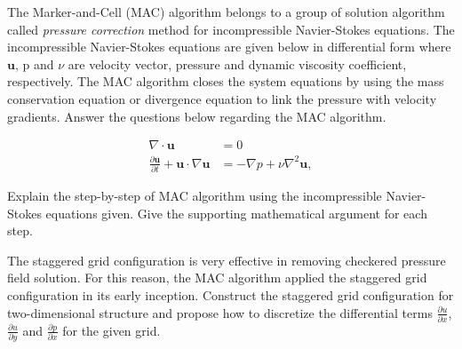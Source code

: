 \clearpage		%
\question{}

The Marker-and-Cell (MAC) algorithm belongs to a group of solution algorithm called \textit{pressure correction} method for incompressible Navier-Stokes equations. The incompressible Navier-Stokes equations are given below in differential form where $\textbf{u}$, p and $\nu$ are velocity vector, pressure and dynamic viscosity coefficient, respectively. The MAC algorithm closes the system equations by using the mass conservation equation or divergence equation to link the pressure with velocity gradients. Answer the questions below regarding the MAC algorithm.   


\begin{subequations}
\begin{align}
\nabla \cdot \textbf{u} &= 0 \nonumber  \\ \nonumber
\frac{\partial \textbf{u}}{\partial t} + \textbf{u} \cdot \nabla \textbf{u}  &= -\nabla p + \nu \nabla^2 \textbf{u},
\end{align}
\end{subequations}

\listbeginx	%
	\item Explain the step-by-step of MAC algorithm using the incompressible Navier-Stokes equations given. Give the supporting mathematical argument for each step.  	
	
	
		
	
	
	\item The staggered grid configuration is very effective in removing checkered pressure field solution. For this reason, the MAC algorithm applied the staggered grid configuration in its early inception. Construct the staggered grid configuration for two-dimensional structure and propose how to discretize the differential terms $\frac{\partial u}{\partial x}$, $\frac{\partial u}{\partial y}$ and $\frac{\partial p}{\partial x}$ for the given grid.       

